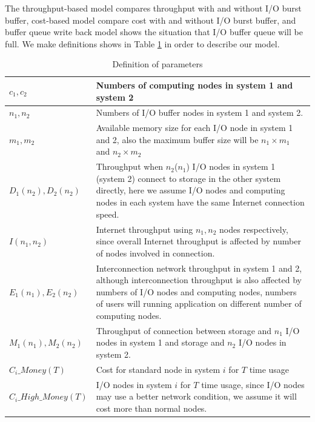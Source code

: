 The throughput-based model compares throughput with and without I/O burst buffer, cost-based model compare cost with and without I/O burst buffer, and buffer queue write back model shows the situation that I/O buffer queue will be full. 
We make definitions shows in Table \ref{definition} in order to describe our model.
\begin{table}[tb]
	\caption{Definition of parameters}
	\label{definition}
\begin{tabular}{|p{3cm}|p{5cm}|}
	\hline
	$c_1,c_2$&Numbers of computing nodes in system 1 and system 2\\\hline
	$n_1, n_2$&Numbers of I/O buffer nodes in system 1 and system 2.\\\hline
	$m_1,m_2$&Available memory size for each I/O node in system 1 and 2, also the maximum buffer size will be $n_1\times m_1$ and $n_2\times m_2$\\\hline
	$D_1(n_2),D_2(n_2)$&Throughput when $n_2$($n_1$) I/O nodes in system 1 (system 2) connect to storage in the other system directly, here we assume I/O nodes and computing nodes in each system have the same Internet connection speed.\\\hline%
	$I(n_1,n_2)$& 	Internet throughput using $n_1,n_2$ nodes respectively, since overall Internet throughput is affected by number of nodes involved in connection.\\\hline
	$E_1(n_1), E_2(n_2)$&Interconnection network throughput in system 1 and 2, although interconnection throughput is also affected by numbers of I/O nodes and computing nodes, numbers of users will running application on different number of computing nodes.\\\hline
	$M_1(n_1),M_2(n_2)$& Throughput of connection between storage and $n_1$ I/O nodes in system 1 and storage and $n_2$ I/O nodes in system 2.\\\hline
	$C_i\_Money(T)$& Cost for standard node in system $i$ for $T$ time usage\\\hline
	$C_i\_High\_Money(T)$ &I/O nodes in system $i$ for $T$ time usage, since I/O nodes may use a better network condition, we assume it will cost more than normal nodes.\\\hline
\end{tabular}
\end{table}

